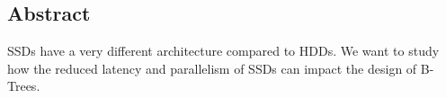 
\subsection*{Abstract}

SSDs have a very different architecture compared to HDDs. We want to study how the reduced latency and parallelism of SSDs can impact the design of B-Trees.


